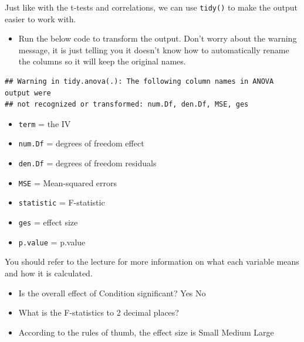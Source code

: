 \documentclass[]{book}
\newenvironment{Shaded}{\begin{snugshade}}{\end{snugshade}}
\newcommand{\KeywordTok}[1]{\textcolor[rgb]{0.13,0.29,0.53}{\textbf{#1}}}
\newcommand{\NormalTok}[1]{#1}
\newcommand{\OperatorTok}[1]{\textcolor[rgb]{0.81,0.36,0.00}{\textbf{#1}}}
\newcommand{\StringTok}[1]{\textcolor[rgb]{0.31,0.60,0.02}{#1}}
\providecommand{\tightlist}{%
  \setlength{\itemsep}{0pt}\setlength{\parskip}{0pt}}
\begin{document}
Just like with the t-tests and correlations, we can use \texttt{tidy()} to make the output easier to work with.

\begin{itemize}
\tightlist
\item
  Run the below code to transform the output. Don't worry about the warning message, it is just telling you it doesn't know how to automatically rename the columns so it will keep the original names.
\end{itemize}

\begin{Shaded}
\end{Shaded}

\begin{verbatim}
## Warning in tidy.anova(.): The following column names in ANOVA output were
## not recognized or transformed: num.Df, den.Df, MSE, ges
\end{verbatim}

\begin{itemize}
\tightlist
\item
  \texttt{term} = the IV\\
\item
  \texttt{num.Df} = degrees of freedom effect
\item
  \texttt{den.Df} = degrees of freedom residuals
\item
  \texttt{MSE} = Mean-squared errors
\item
  \texttt{statistic} = F-statistic
\item
  \texttt{ges} = effect size\\
\item
  \texttt{p.value} = p.value
\end{itemize}

You should refer to the lecture for more information on what each variable means and how it is calculated.

\begin{itemize}
\tightlist
\item
  Is the overall effect of Condition significant? Yes No
\item
  What is the F-statistics to 2 decimal places? 
\item
  According to the rules of thumb, the effect size is Small Medium Large
\end{itemize}
\end{document}

